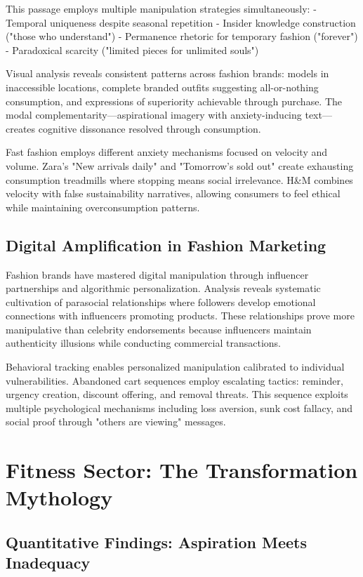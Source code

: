 This passage employs multiple manipulation strategies simultaneously:
- Temporal uniqueness despite seasonal repetition
- Insider knowledge construction ("those who understand")
- Permanence rhetoric for temporary fashion ("forever")
- Paradoxical scarcity ("limited pieces for unlimited souls")

Visual analysis reveals consistent patterns across fashion brands: models in inaccessible locations, complete branded outfits suggesting all-or-nothing consumption, and expressions of superiority achievable through purchase. The modal complementarity—aspirational imagery with anxiety-inducing text—creates cognitive dissonance resolved through consumption.

Fast fashion employs different anxiety mechanisms focused on velocity and volume. Zara's "New arrivals daily" and "Tomorrow's sold out" create exhausting consumption treadmills where stopping means social irrelevance. H\&M combines velocity with false sustainability narratives, allowing consumers to feel ethical while maintaining overconsumption patterns.

\subsection{Digital Amplification in Fashion Marketing}

Fashion brands have mastered digital manipulation through influencer partnerships and algorithmic personalization. Analysis reveals systematic cultivation of parasocial relationships where followers develop emotional connections with influencers promoting products. These relationships prove more manipulative than celebrity endorsements because influencers maintain authenticity illusions while conducting commercial transactions.

Behavioral tracking enables personalized manipulation calibrated to individual vulnerabilities. Abandoned cart sequences employ escalating tactics: reminder, urgency creation, discount offering, and removal threats. This sequence exploits multiple psychological mechanisms including loss aversion, sunk cost fallacy, and social proof through "others are viewing" messages.

\section{Fitness Sector: The Transformation Mythology}
\label{sec:fitness_analysis}

\subsection{Quantitative Findings: Aspiration Meets Inadequacy}

